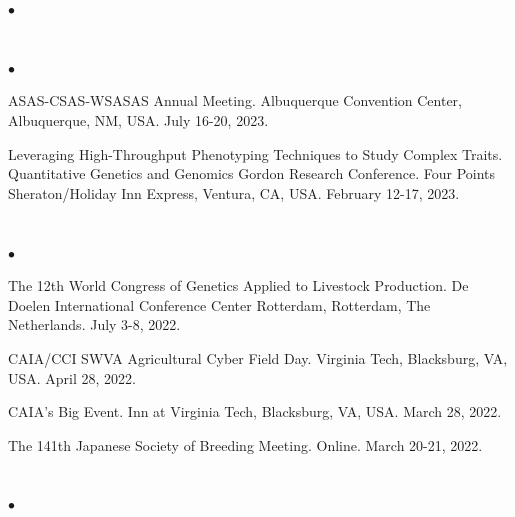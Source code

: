 \documentclass[margin,line,10pt]{res}
\newenvironment{list2}{
  \begin{list}{$\bullet$}{%
      \setlength{\itemsep}{0in}
      \setlength{\parsep}{0in} \setlength{\parskip}{0in}
      \setlength{\topsep}{0in} \setlength{\partopsep}{0in} 
      \setlength{\leftmargin}{0.2in}}}{\end{list}}
\begin{document}
\begin{resume}
\begin{list2}
\end{list2}


\section{}
\begin{list2}

  \item ASAS-CSAS-WSASAS Annual Meeting. Albuquerque Convention Center, Albuquerque, NM, USA. July 16-20, 2023. 

  \vspace{0.5cm}

  \item Leveraging High-Throughput Phenotyping Techniques to Study Complex Traits. Quantitative Genetics and Genomics Gordon Research Conference. Four Points Sheraton/Holiday Inn Express, Ventura, CA, USA. February 12-17, 2023.

\end{list2}

\section{}
\begin{list2}

\item   The 12th World Congress of Genetics Applied to Livestock Production. De Doelen International Conference Center Rotterdam, Rotterdam, The Netherlands. July 3-8, 2022.

    \vspace{0.5cm}

    
  \item  CAIA/CCI SWVA Agricultural Cyber Field Day. Virginia Tech, Blacksburg, VA, USA. April 28, 2022.

       
  \vspace{0.5cm}

\item  CAIA's Big Event. Inn at Virginia Tech, Blacksburg, VA, USA. March 28, 2022.

       
  \vspace{0.5cm}
  
\item The 141th Japanese Society of Breeding Meeting. Online. March 20-21, 2022. 
  
\end{list2}


\section{}
\begin{list2}


\end{list2}
\end{resume}
\end{document}
